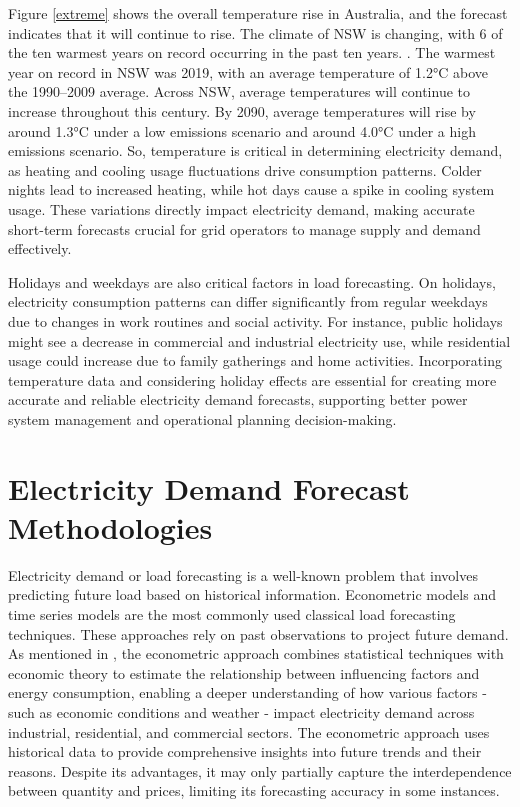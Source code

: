 \documentclass[mstat,12pt]{unswthesis}
\begin{document}
Figure \ref{extreme} shows the overall temperature rise in Australia,
and the forecast indicates that it will continue to rise. The climate of
NSW is changing, with 6 of the ten warmest years on record occurring in
the past ten years. \cite{nswAdaptNSW}. The warmest year on record in
NSW was 2019, with an average temperature of 1.2°C above the 1990--2009
average. Across NSW, average temperatures will continue to increase
throughout this century. By 2090, average temperatures will rise by
around 1.3°C under a low emissions scenario and around 4.0°C under a
high emissions scenario. So, temperature is critical in determining
electricity demand, as heating and cooling usage fluctuations drive
consumption patterns. Colder nights lead to increased heating, while hot
days cause a spike in cooling system usage. These variations directly
impact electricity demand, making accurate short-term forecasts crucial
for grid operators to manage supply and demand effectively.

Holidays and weekdays are also critical factors in load forecasting. On
holidays, electricity consumption patterns can differ significantly from
regular weekdays due to changes in work routines and social activity.
For instance, public holidays might see a decrease in commercial and
industrial electricity use, while residential usage could increase due
to family gatherings and home activities. Incorporating temperature data
and considering holiday effects are essential for creating more accurate
and reliable electricity demand forecasts, supporting better power
system management and operational planning decision-making.

\bigskip

\hypertarget{electricity-demand-forecast-methodologies}{%
\section{Electricity Demand Forecast
Methodologies}\label{electricity-demand-forecast-methodologies}}

Electricity demand or load forecasting is a well-known problem that
involves predicting future load based on historical information.
Econometric models and time series models are the most commonly used
classical load forecasting techniques. These approaches rely on past
observations to project future demand. As mentioned in \cite{9812604},
the econometric approach combines statistical techniques with economic
theory to estimate the relationship between influencing factors and
energy consumption, enabling a deeper understanding of how various
factors - such as economic conditions and weather - impact electricity
demand across industrial, residential, and commercial sectors. The
econometric approach uses historical data to provide comprehensive
insights into future trends and their reasons. Despite its advantages,
it may only partially capture the interdependence between quantity and
prices, limiting its forecasting accuracy in some instances.
\end{document}

